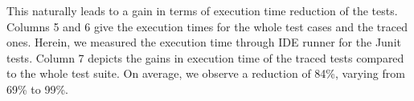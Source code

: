 This naturally leads to a gain in terms of execution time reduction of the tests. 
Columns 5 and 6 give the execution times for the whole test cases and the traced ones. Herein, we measured the execution time through IDE runner for the Junit tests.
Column 7 depicts the gains in execution time of the traced tests compared to the whole test suite. On average, we observe a reduction of 84\%, varying from 69\% to 99\%. 


